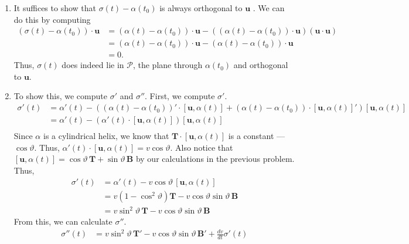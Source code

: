 \documentclass[12 pt, letterpaper]{hmcpset}
\begin{document}
\begin{solution}
	\begin{enumerate}
		\item It suffices to show that $\sigma(t) - \alpha(t_{0})$  is always orthogonal to $\mathbf{u}$ . We can do this by computing
			\[
				\begin{split}
					(\sigma(t) - \alpha(t_{0})) \cdot \mathbf{u} & = (\alpha(t) - \alpha(t_{0})) \cdot \mathbf{u} - ((\alpha(t) - \alpha(t_{0})) \cdot \mathbf{u}) (\mathbf{u} \cdot \mathbf{u}) \\
										     & = (\alpha(t) - \alpha(t_{0})) \cdot \mathbf{u} - (\alpha(t) - \alpha(t_{0})) \cdot \mathbf{u} \\
										     & = 0.
				\end{split}
			\]
		Thus, $\sigma(t)$ does indeed lie in $\mathcal{P}$, the plane through $\alpha(t_{0})$ and orthogonal to $\mathbf{u}$.
		\item To show this, we compute $\sigma'$ and $\sigma''$. First, we compute $\sigma'$.
			\[
				\begin{split}
					\sigma'(t) & = \alpha'(t) - ((\alpha(t) - \alpha(t_{0}))' \cdot [\mathbf{u}, \alpha(t)] + (\alpha(t) - \alpha(t_{0})) \cdot [\mathbf{u}, \alpha(t)]') [\mathbf{u}, \alpha(t)] \\
						   & = \alpha'(t) - (\alpha'(t) \cdot [\mathbf{u}, \alpha(t)]) [\mathbf{u}, \alpha(t)] \\
				\end{split}
			\]
			Since $\alpha$ is a cylindrical helix, we know that $\mathbf{T} \cdot [\mathbf{u}, \alpha(t)]$ is a constant --- $\cos{\vartheta}$. Thus, $\alpha'(t) \cdot [\mathbf{u}, \alpha(t)] = v \cos{\vartheta}$. Also notice that $[\mathbf{u}, \alpha(t)] = \cos{\vartheta} \, \mathbf{T} + \sin{\vartheta} \, \mathbf{B}$ by our calculations in the previous problem. Thus,
			\[
				\begin{split}
					\sigma'(t) & = \alpha'(t) - v \cos{\vartheta} \, [\mathbf{u}, \alpha(t)] \\
						   & = v(1 - \cos^{2}{\vartheta}) \mathbf{T} - v \cos{\vartheta} \sin{\vartheta} \, \mathbf{B} \\
						   & = v \sin^{2}{\vartheta} \, \mathbf{T} - v \cos{\vartheta} \sin{\vartheta} \, \mathbf{B}
				\end{split}
			\]
			From this, we can calculate $\sigma''$.
			\[
				\begin{split}
					\sigma''(t) & = v \sin^{2}{\vartheta} \, \mathbf{T}' - v \cos{\vartheta} \sin{\vartheta} \, \mathbf{B}' + \frac{dv}{dt} \sigma'(t) \\

\end{split}\]
\end{enumerate}
\end{solution}
\end{document}

